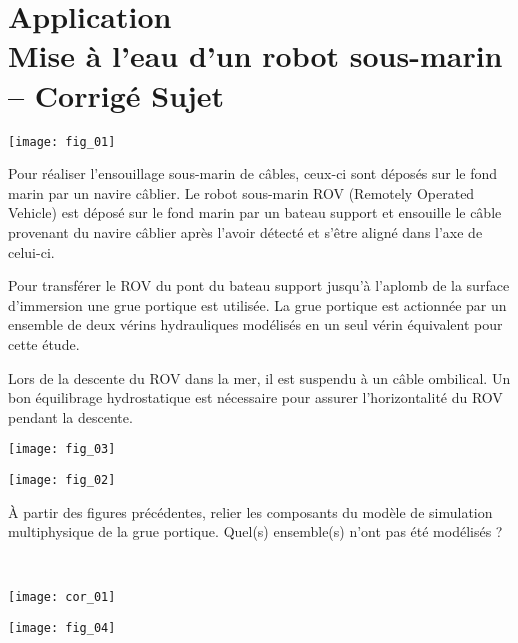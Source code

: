 \chapter*{Application  \\ 
Mise à l'eau d'un robot sous-marin -- \ifprof Corrigé \else Sujet \fi}
\ifprof {} \else  \fi
\setcounter{question}{0}

\begin{marginfigure}
\texttt{[image: fig\_01]}
\end{marginfigure}



\ifprof
\else
Pour réaliser l’ensouillage sous-marin de câbles, ceux-ci sont déposés sur le fond marin par un navire câblier. Le robot sous-marin ROV (Remotely Operated Vehicle) est déposé sur le fond marin par un bateau support et ensouille le câble provenant
du navire câblier après l’avoir détecté et s’être aligné dans l’axe de celui-ci.

Pour transférer le ROV du pont du bateau support jusqu’à l’aplomb de la surface d’immersion une grue portique est utilisée. 
La grue portique est actionnée par un ensemble de deux vérins hydrauliques modélisés en un seul vérin équivalent pour cette étude.

Lors de la descente du ROV dans la mer, il est suspendu à un câble ombilical. Un bon équilibrage hydrostatique est
nécessaire pour assurer l’horizontalité du ROV pendant la descente.

\begin{marginfigure}
\texttt{[image: fig\_03]}
\end{marginfigure}

\begin{center}
\texttt{[image: fig\_02]}
\end{center}

\fi

\begin{question}
À partir des figures précédentes, relier les composants du modèle de simulation
multiphysique de la grue portique. Quel(s) ensemble(s) n’ont pas été modélisés ?
\end{question}

\ifprof
\begin{corrige}~\\

\begin{center}
\texttt{[image: cor\_01]}
\end{center}
\end{corrige}
\else
\fi


\ifprof
\else
\begin{center}
\texttt{[image: fig\_04]}
\end{center}
\fi
